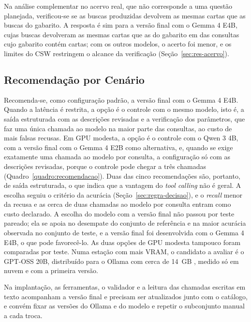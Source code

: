 Na análise complementar no acervo real, que não corresponde a uma questão planejada, verificou-se se as buscas produzidas devolvem as mesmas cartas que as buscas do gabarito. A resposta é sim para a versão final com o Gemma 4 E4B, cujas buscas devolveram as mesmas cartas que as do gabarito em  das consultas cujo gabarito contém cartas; com os outros modelos, o acerto foi menor, e os limites do CSW restringem o alcance da verificação (Seção~\ref{sec:res-acervo}).

\subsection{Recomendação por Cenário}
\label{sec:recomendacao}

Recomenda-se, como configuração padrão, a versão final com o Gemma 4 E4B. Quando a latência é restrita, a opção é o controle com o mesmo modelo, isto é, a saída estruturada com as descrições revisadas e a verificação dos parâmetros, que faz uma única chamada ao modelo na maior parte das consultas, ao custo de mais falsas recusas. Em GPU modesta, a opção é o controle com o Qwen 3 4B, com a versão final com o Gemma 4 E2B como alternativa, e, quando se exige exatamente uma chamada ao modelo por consulta, a configuração só com as descrições revisadas, porque o controle pode chegar a três chamadas (Quadro~\ref{quadro:recomendacao}). Duas das cinco recomendações são, portanto, de saída estruturada, o que indica que a vantagem do \textit{tool calling} não é geral. A escolha seguiu o critério da acurácia (Seção~\ref{sec:regra-decisao}), e o \textit{recall} menor da recusa e as cerca de duas chamadas ao modelo por consulta entram como custo declarado. A escolha do modelo com a versão final não passou por teste pareado; ela se apoia no desempate do conjunto de referência e na maior acurácia observada no conjunto de teste, e a versão final foi desenvolvida com o Gemma 4 E4B, o que pode favorecê-lo. As duas opções de GPU modesta tampouco foram comparadas por teste. Numa estação com mais VRAM, o candidato a avaliar é o GPT-OSS 20B, distribuído para o Ollama com cerca de 14~GB \cite{ollama2025gptoss}, medido só em nuvem e com a primeira versão.

Na implantação, as ferramentas, o validador e a leitura das chamadas escritas em texto acompanham a versão final e precisam ser atualizados junto com o catálogo, e convém fixar as versões do Ollama e do modelo e repetir o subconjunto manual a cada troca.

